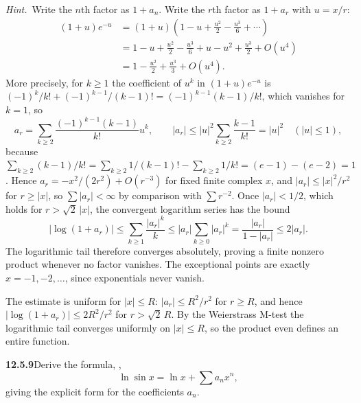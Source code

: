 \emph{Hint.}~Write the $n$th factor as $1+a_{n}$.
\solution
Write the $r$th factor as $1+a_r$ with $u=x/r$:
\begin{align*}
(1+u)e^{-u}
&=(1+u)\left(1-u+\frac{u^2}{2}-\frac{u^3}{6}+\cdots\right)\\
&=1-u+\frac{u^2}{2}-\frac{u^3}{6}+u-u^2+\frac{u^3}{2}+O(u^4)\\
&=1-\frac{u^2}{2}+\frac{u^3}{3}+O(u^4).
\end{align*}
More precisely, for $k\ge1$ the coefficient of $u^k$ in $(1+u)e^{-u}$ is
$(-1)^k/k!+(-1)^{k-1}/(k-1)!=(-1)^{k-1}(k-1)/k!$, which vanishes for
$k=1$, so
\[
a_r=\sum_{k\ge2}\frac{(-1)^{k-1}(k-1)}{k!}u^k,\qquad
|a_r|\le|u|^2\sum_{k\ge2}\frac{k-1}{k!}=|u|^2\quad(|u|\le1),
\]
because $\sum_{k\ge2}(k-1)/k!=\sum_{k\ge2}1/(k-1)!-\sum_{k\ge2}1/k!
=(e-1)-(e-2)=1$.
Hence $a_r=-x^2/(2r^2)+O(r^{-3})$ for fixed finite complex $x$,
and $|a_r|\le|x|^2/r^2$ for $r\ge|x|$, so $\sum|a_r|<\infty$ by
comparison with $\sum r^{-2}$. Once $|a_r|<1/2$, which holds for
$r>\sqrt2\,|x|$, the convergent logarithm series has the bound
\[
|\log(1+a_r)|
\le\sum_{k\ge1}\frac{|a_r|^k}{k}\le|a_r|\sum_{k\ge0}|a_r|^k
=\frac{|a_r|}{1-|a_r|}\le2|a_r|.
\]
The logarithmic tail therefore converges absolutely, proving a finite
nonzero product whenever no factor vanishes. The exceptional points
are exactly $x=-1,-2,\ldots$, since exponentials never vanish.

The estimate is uniform for $|x|\le R$: $|a_r|\le R^2/r^2$ for $r\ge R$,
and hence $|\log(1+a_r)|\le2R^2/r^2$ for $r>\sqrt2\,R$. By the
Weierstrass M-test the logarithmic tail converges uniformly on
$|x|\le R$, so the product even defines an entire function.

\par\bigskip
\noindent\textbf{12.5.9}\quad Derive the formula, ,
\[
\ln\sin x=\ln x+\sum a_{n}x^{n},
\]
giving the explicit form for the coefficients $a_{n}$.

